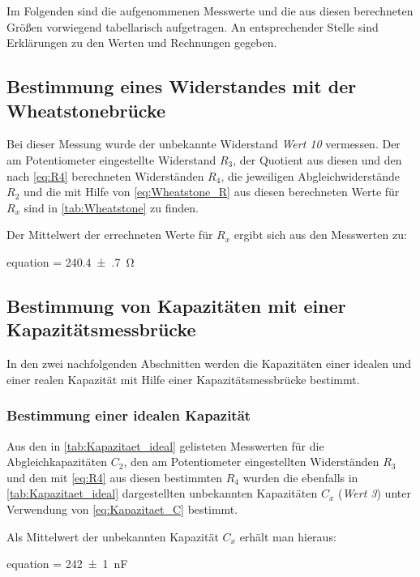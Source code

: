 Im Folgenden sind die aufgenommenen Messwerte und die aus diesen
berechneten Größen vorwiegend tabellarisch aufgetragen. An entsprechender 
Stelle sind Erklärungen zu den Werten und Rechnungen gegeben. 

\subsection{Bestimmung eines Widerstandes mit der Wheatstonebrücke}
\label{sec:Auswertung_Wheatstone}

	Bei dieser Messung wurde der unbekannte Widerstand \emph{Wert 10} vermessen.
	Der am Potentiometer eingestellte Widerstand $R_{3}$, der Quotient aus diesen und den nach \cref{eq:R4} berechneten
	Widerständen $R_{4}$, die jeweiligen
	Abgleichwiderstände $R_{2}$ und die mit Hilfe von \cref{eq:Wheatstone_R} aus diesen
	berechneten Werte für $R_{x}$ sind in \cref{tab:Wheatstone} zu finden.
	
	
	
	Der Mittelwert der errechneten Werte für $R_{x}$ ergibt sich aus den Messwerten zu:
	\begin{empheq}{equation}
		 = \SI{240.4(7)}{\ohm}
	\end{empheq}
	
\subsection{Bestimmung von Kapazitäten mit einer Kapazitätsmessbrücke}
\label{sec:Auswertung_Kapazitaet}
	In den zwei nachfolgenden Abschnitten werden die Kapazitäten einer 
	idealen und einer realen Kapazität mit Hilfe einer Kapazitätsmessbrücke
	bestimmt.
	
	\subsubsection{Bestimmung einer idealen Kapazität}
	\label{sec:Auswertung_Kapazität_ideal}
		Aus den in \cref{tab:Kapazitaet_ideal} gelisteten Messwerten für die Abgleichkapazitäten
		$C_{2}$, den am Potentiometer eingestellten Widerständen $R_{3}$ und den mit \cref{eq:R4} 
		aus diesen bestimmten $R_{4}$ wurden die ebenfalls in \cref*{tab:Kapazitaet_ideal} dargestellten
		unbekannten Kapazitäten $C_{x}$ (\emph{Wert 3}) unter Verwendung von \cref{eq:Kapazitaet_C} bestimmt. 
		
			
	
		Als Mittelwert der unbekannten Kapazität $C_{x}$ erhält man hieraus:
		\begin{empheq}{equation}
			 = \SI{242(1)}{\nano\farad}
		\end{empheq} 
	
